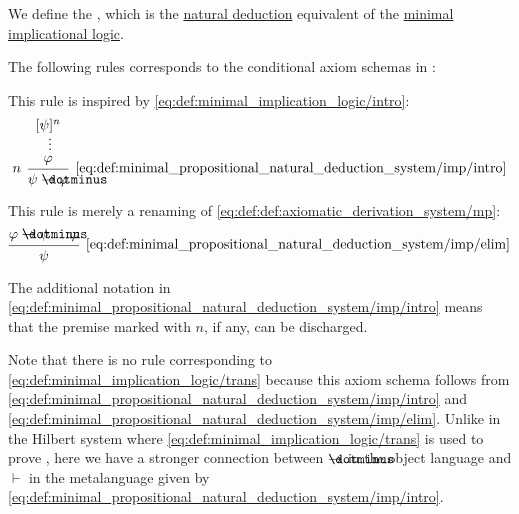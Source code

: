\begin{definition}\label{def:minimal_propositional_natural_deduction_system}
  We define the , which is the \hyperref[def:propositional_natural_deduction_system]{natural deduction} equivalent of the \hyperref[def:minimal_implicational_logic]{minimal implicational logic}.

  \begin{thmenum}
     The following rules corresponds to the conditional axiom schemas in :

    \begin{minipage}[t]{0.45\textwidth}
      This rule is inspired by \eqref{eq:def:minimal_implication_logic/intro}:
      \begin{equation*}\taglabel[\( \rightarrow^+ \)]{eq:def:minimal_propositional_natural_deduction_system/imp/intro}
        \begin{prooftree}
          \hypo{ [\psi]^n }
          \ellipsis {} { \varphi }
          \infer[left label=\( n \)]1[\ref{eq:def:minimal_propositional_natural_deduction_system/imp/intro}]{ \psi \synimplies \varphi }
        \end{prooftree}
      \end{equation*}
    \end{minipage}
    \hfill
    \begin{minipage}[t]{0.45\textwidth}
      This rule is merely a renaming of \eqref{eq:def:def:axiomatic_derivation_system/mp}:
      \begin{equation*}\taglabel[\( \rightarrow^- \)]{eq:def:minimal_propositional_natural_deduction_system/imp/elim}
        \begin{prooftree}
          \hypo{ \varphi \synimplies \psi }
          \hypo{ \varphi }
          \infer2[\ref{eq:def:minimal_propositional_natural_deduction_system/imp/elim}]{ \psi }
        \end{prooftree}
      \end{equation*}
    \end{minipage}

    The additional notation in \eqref{eq:def:minimal_propositional_natural_deduction_system/imp/intro} means that the premise marked with \( n \), if any, can be discharged.

    Note that there is no rule corresponding to \eqref{eq:def:minimal_implication_logic/trans} because this axiom schema follows from \eqref{eq:def:minimal_propositional_natural_deduction_system/imp/intro} and \eqref{eq:def:minimal_propositional_natural_deduction_system/imp/elim}. Unlike in the Hilbert system where \eqref{eq:def:minimal_implication_logic/trans} is used to prove , here we have a stronger connection between \( \synimplies \) in the object language and \( \vdash \) in the metalanguage given by \eqref{eq:def:minimal_propositional_natural_deduction_system/imp/intro}.


\end{thmenum}
\end{definition}
